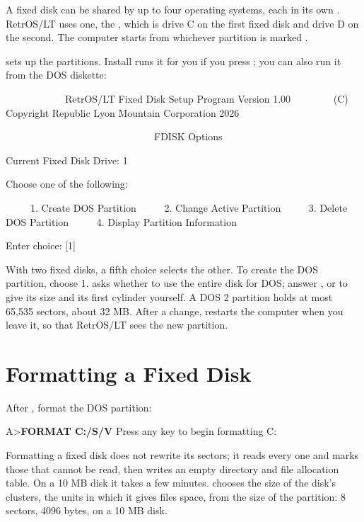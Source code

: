 A fixed disk can be shared by up to four operating systems, each in its
own . RetrOS/LT uses one, the , which
is drive C on the first fixed disk and drive D on the second. The computer
starts from whichever partition is marked .

 sets up the partitions. Install runs it for you if you press
; you can also run it from the DOS diskette:

\begin{dialogue}
\ \ \ \ \ \ \ \ \ \ \ \ RetrOS/LT Fixed Disk Setup Program Version 1.00
\ \ \ \ \ \ \ \ (C) Copyright Republic Lyon Mountain Corporation 2026

\ \ \ \ \ \ \ \ \ \ \ \ \ \ \ \ \ \ \ \ \ \ \ \ \ \ \ \ \ \ FDISK Options

Current Fixed Disk Drive: 1

Choose one of the following:

\ \ \ \ \ 1. Create DOS Partition
\ \ \ \ \ 2. Change Active Partition
\ \ \ \ \ 3. Delete DOS Partition
\ \ \ \ \ 4. Display Partition Information


Enter choice: [1]
\end{dialogue}

With two fixed disks, a fifth choice selects the other. To create the DOS
partition, choose 1.  asks whether to use the entire disk for
DOS; answer , or  to give its size and its first
cylinder yourself. A DOS 2 partition holds at most 65,535 sectors, about
32 MB. After a change,  restarts the computer when you leave
it, so that RetrOS/LT sees the new partition.


\section{Formatting a Fixed Disk}

After , format the DOS partition:

\begin{dialogue}
A>\textbf{FORMAT C:/S/V}
Press any key to begin formatting C:
\end{dialogue}

Formatting a fixed disk does not rewrite its sectors; it reads every one
and marks those that cannot be read, then writes an empty directory and
file allocation table. On a 10 MB disk it takes a few minutes.
 chooses the size of the disk's clusters, the units in
which it gives files space, from the size of the partition: 8 sectors,
4096 bytes, on a 10 MB disk.

